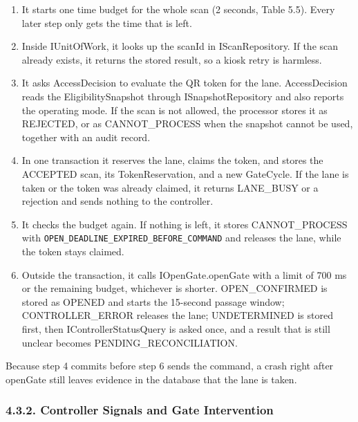 \begin{enumerate}[leftmargin=36pt, itemsep=2pt, topsep=4pt, parsep=2pt]
  \item It starts one time budget for the whole scan (2 seconds, Table 5.5). Every later step only gets the time that is left.
  \item Inside IUnitOfWork, it looks up the scanId in IScanRepository. If the scan already exists, it returns the stored result, so a kiosk retry is harmless.
  \item It asks AccessDecision to evaluate the QR token for the lane. AccessDecision reads the EligibilitySnapshot through ISnapshotRepository and also reports the operating mode. If the scan is not allowed, the processor stores it as REJECTED, or as CANNOT\_PROCESS when the snapshot cannot be used, together with an audit record.
  \item In one transaction it reserves the lane, claims the token, and stores the ACCEPTED scan, its TokenReservation, and a new GateCycle. If the lane is taken or the token was already claimed, it returns LANE\_BUSY or a rejection and sends nothing to the controller.
  \item It checks the budget again. If nothing is left, it stores CANNOT\_PROCESS with \texttt{OPEN\_DEADLINE\_EXPIRED\_}\allowbreak\texttt{BEFORE\_COMMAND} and releases the lane, while the token stays claimed.
  \item Outside the transaction, it calls IOpenGate.openGate with a limit of 700 ms or the remaining budget, whichever is shorter. OPEN\_CONFIRMED is stored as OPENED and starts the 15-second passage window; CONTROLLER\_ERROR releases the lane; UNDETERMINED is stored first, then IControllerStatusQuery is asked once, and a result that is still unclear becomes PENDING\_RECONCILIATION.
\end{enumerate}

Because step 4 commits before step 6 sends the command, a crash right after openGate still leaves evidence in the database that the lane is taken.

\subsubsection*{4.3.2. Controller Signals and Gate Intervention}

{}

